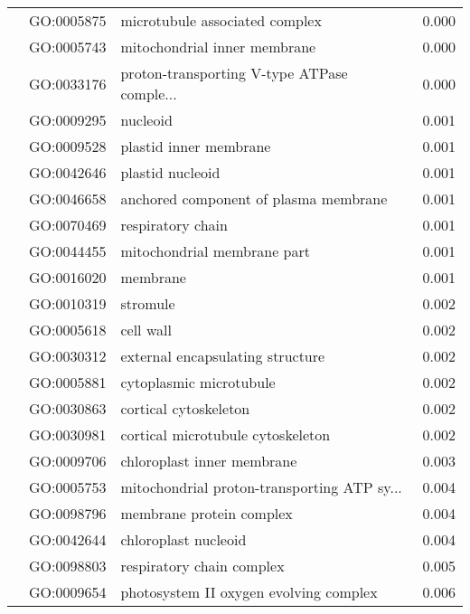 \begin{longtable}{lllr}
   & GO:0005875 &               microtubule associated complex &         0.000 \\
   & GO:0005743 &                 mitochondrial inner membrane &         0.000 \\
   & GO:0033176 &  proton-transporting V-type ATPase comple... &         0.000 \\
   & GO:0009295 &                                     nucleoid &         0.001 \\
   & GO:0009528 &                       plastid inner membrane &         0.001 \\
   & GO:0042646 &                             plastid nucleoid &         0.001 \\
   & GO:0046658 &        anchored component of plasma membrane &         0.001 \\
   & GO:0070469 &                            respiratory chain &         0.001 \\
   & GO:0044455 &                  mitochondrial membrane part &         0.001 \\
   & GO:0016020 &                                     membrane &         0.001 \\
   & GO:0010319 &                                     stromule &         0.002 \\
   & GO:0005618 &                                    cell wall &         0.002 \\
   & GO:0030312 &             external encapsulating structure &         0.002 \\
   & GO:0005881 &                      cytoplasmic microtubule &         0.002 \\
   & GO:0030863 &                        cortical cytoskeleton &         0.002 \\
   & GO:0030981 &            cortical microtubule cytoskeleton &         0.002 \\
   & GO:0009706 &                   chloroplast inner membrane &         0.003 \\
   & GO:0005753 &  mitochondrial proton-transporting ATP sy... &         0.004 \\
   & GO:0098796 &                     membrane protein complex &         0.004 \\
   & GO:0042644 &                         chloroplast nucleoid &         0.004 \\
   & GO:0098803 &                    respiratory chain complex &         0.005 \\
   & GO:0009654 &       photosystem II oxygen evolving complex &         0.006 \\

\end{longtable}
